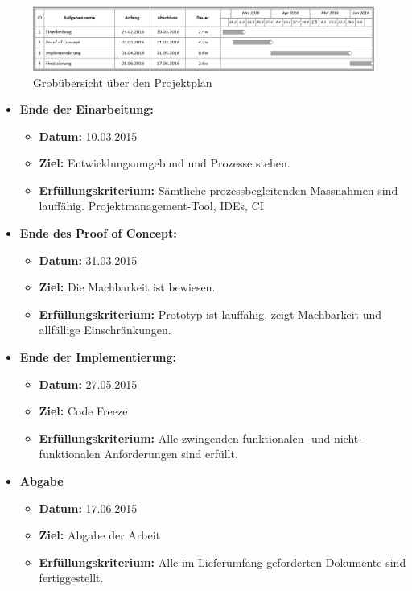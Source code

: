 \begin{figure}[ht]
	\centering
	\includegraphics[width=\textwidth]{images/projplan.png}
	\caption{Grobübersicht über den Projektplan}
	\label{Risk result}
\end{figure}


\begin{itemize}
	\item{\textbf{Ende der Einarbeitung:} 
		\begin{itemize}
			\item{\textbf{Datum:} 10.03.2015}
			\item{\textbf{Ziel:} Entwicklungsumgebund und Prozesse stehen.}
			\item{\textbf{Erfüllungskriterium:} Sämtliche prozessbegleitenden Massnahmen sind lauffähig. Projektmanagement-Tool, IDEs, CI}
		\end{itemize}
	}
	
	\item{\textbf{Ende des Proof of Concept:} 
		\begin{itemize}
			\item{\textbf{Datum:} 31.03.2015}
			\item{\textbf{Ziel:} Die Machbarkeit ist bewiesen.}
			\item{\textbf{Erfüllungskriterium:} Prototyp ist lauffähig, zeigt Machbarkeit und allfällige Einschränkungen.}
		\end{itemize}
	}
	
	\item{\textbf{Ende der Implementierung:} 
		\begin{itemize}
			\item{\textbf{Datum:} 27.05.2015}
			\item{\textbf{Ziel:} Code Freeze}
			\item{\textbf{Erfüllungskriterium:} Alle zwingenden funktionalen- und nicht-funktionalen Anforderungen sind erfüllt.}
		\end{itemize}
	}	
	\item{\textbf{Abgabe} 
			\begin{itemize}
				\item{\textbf{Datum:} 17.06.2015}
				\item{\textbf{Ziel:} Abgabe der Arbeit}
				\item{\textbf{Erfüllungskriterium:} Alle im Lieferumfang geforderten Dokumente sind fertiggestellt.}
			\end{itemize}
	}
	
\end{itemize}

